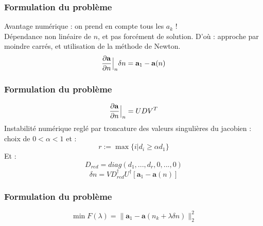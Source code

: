 \documentclass[handout]{beamer}
\def\restriction#1#2{\mathchoice
              {\setbox1\hbox{${\displaystyle #1}_{\scriptstyle #2}$}
              \restrictionaux{#1}{#2}}
              {\setbox1\hbox{${\textstyle #1}_{\scriptstyle #2}$}
              \restrictionaux{#1}{#2}}
              {\setbox1\hbox{${\scriptstyle #1}_{\scriptscriptstyle #2}$}
              \restrictionaux{#1}{#2}}
              {\setbox1\hbox{${\scriptscriptstyle #1}_{\scriptscriptstyle #2}$}
              \restrictionaux{#1}{#2}}}
\def\restrictionaux#1#2{{#1\,\smash{\vrule height .8\ht1 depth .85\dp1}}_{\,#2}}
\begin{document}
\begin{frame}
	\frametitle{Formulation du problème}
Avantage numérique : on prend en compte tous les $a_k$ !\\
Dépendance non linéaire de $n$, et pas forcément de solution. D'où : approche par moindre carrés, et utilisation de la méthode de Newton.
\begin{equation}\label{eq24}
	\restriction{\frac{\partial\mathbf{a}}{\partial n}}{n}\delta n=\mathbf{a}_1-\mathbf{a}(n)
\end{equation}
\end{frame}

\begin{frame}
	\frametitle{Formulation du problème}
	\[\restriction{\frac{\partial\mathbf{a}}{\partial n}}{n}=UDV^T\]
Instabilité numérique reglé par troncature des valeurs singulières du jacobien : choix de $0<\alpha<1$ et :
	\[r:=\max\{i | d_i\geq \alpha d_1\}\]
Et :
	\[D_{red}=diag(d_1,...,d_r,0,...,0)\]
\begin{equation}\label{eq26}
	\delta n=VD_{red}^\dagger U^\dagger [\mathbf{a}_1-\mathbf{a}(n)]
\end{equation}
\end{frame}

\begin{frame}
	\frametitle{Formulation du problème}
	\[\min F(\lambda)=\|\mathbf{a}_1-\mathbf{a}(n_k+\lambda\delta n)\|_2^2\]

\end{frame}
\end{document}
